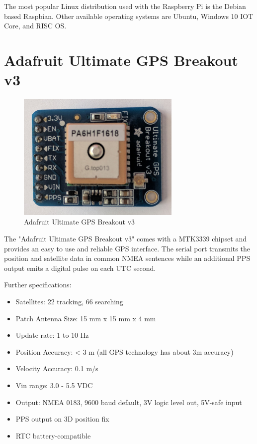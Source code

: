 The most popular Linux distribution used with the Raspberry Pi is the Debian based Raspbian. Other available operating systems are Ubuntu, Windows 10 IOT Core, and RISC OS.

\section{Adafruit Ultimate GPS Breakout v3}

\begin{figure}[tb]
	\centering
	\includegraphics[width=0.7\textwidth]{figures/hw_gps.jpg}
	\caption{Adafruit Ultimate GPS Breakout v3}
	\label{fig:gps}
\end{figure}

The "Adafruit Ultimate GPS Breakout v3" comes with a MTK3339 chipset and provides an easy to use and reliable GPS interface.\cite{ada_gps} The serial port transmits the position and satellite data in common NMEA sentences while an additional PPS output emits a digital pulse on each UTC second.

Further specifications:
\begin{itemize}
	\item Satellites: 22 tracking, 66 searching
	\item Patch Antenna Size: 15 mm x 15 mm x 4 mm
	\item Update rate: 1 to 10 Hz
	\item Position Accuracy: < 3 m (all GPS technology has about 3m accuracy)
	\item Velocity Accuracy: 0.1 m/s
	\item Vin range: 3.0 - 5.5 VDC
	\item Output: NMEA 0183, 9600 baud default, 3V logic level out, 5V-safe input
	\item PPS output on 3D position fix
	\item RTC battery-compatible
\end{itemize}

